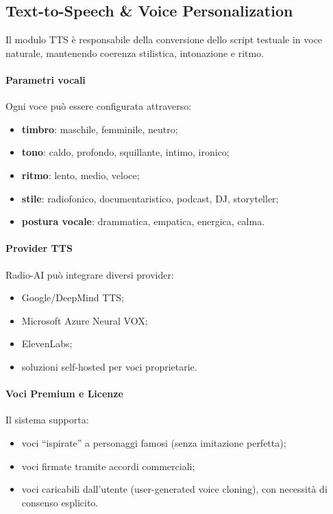 \documentclass[11pt,a4paper]{article}
\begin{document}

\subsection{Text-to-Speech \& Voice Personalization}

Il modulo TTS è responsabile della conversione dello script testuale in voce naturale, mantenendo coerenza stilistica, intonazione e ritmo.

\paragraph{Parametri vocali}

Ogni voce può essere configurata attraverso:
\begin{itemize}
    \item \textbf{timbro}: maschile, femminile, neutro;
    \item \textbf{tono}: caldo, profondo, squillante, intimo, ironico;
    \item \textbf{ritmo}: lento, medio, veloce;
    \item \textbf{stile}: radiofonico, documentaristico, podcast, DJ, storyteller;
    \item \textbf{postura vocale}: drammatica, empatica, energica, calma.
\end{itemize}

\paragraph{Provider TTS}

Radio-AI può integrare diversi provider:
\begin{itemize}
    \item Google/DeepMind TTS;
    \item Microsoft Azure Neural VOX;
    \item ElevenLabs;
    \item soluzioni self-hosted per voci proprietarie.
\end{itemize}

\paragraph{Voci Premium e Licenze}

Il sistema supporta:
\begin{itemize}
    \item voci “ispirate” a personaggi famosi (senza imitazione perfetta);
    \item voci firmate tramite accordi commerciali;
    \item voci caricabili dall’utente (user-generated voice cloning), con necessità di consenso esplicito.
\end{itemize}
\end{document}

